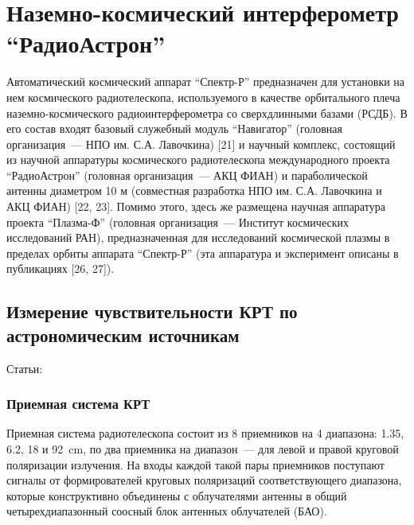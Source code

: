 \graphicspath{{Dissertation/images/chapt2/}}

\chapter{Наземно-космический интерферометр ``РадиоАстрон''} \label{chapt2}

Автоматический космический аппарат ``Спектр-Р'' предназначен для установки на нем космического
радиотелескопа, используемого в качестве орбитального плеча наземно-космического
радиоинтерферометра со сверхдлинными базами (РСДБ). В его состав входят базовый служебный модуль
``Навигатор'' (головная организация~--- НПО им. С.А. Лавочкина) [21] и научный комплекс, состоящий
из научной аппаратуры космического радиотелескопа международного проекта ``РадиоАстрон'' (головная
организация~--- АКЦ ФИАН) и параболической антенны диаметром 10 м (совместная разработка НПО им.
С.А. Лавочкина и АКЦ ФИАН) [22, 23]. Помимо этого, здесь же размещена научная аппаратура проекта
``Плазма-Ф'' (головная организация~--- Институт космических исследований РАН), предназначенная для
исследований космической плазмы в пределах орбиты аппарата ``Спектр-Р'' (эта аппаратура и
эксперимент описаны в публикациях [26, 27]).



\section{Измерение чувствительности КРТ по астрономическим источникам}

Статьи: \cite{Kardashev_2013_rus, Kovalev_2014_rus}

\subsection{Приемная система КРТ}

Приемная система радиотелескопа состоит из 8 приемников на 4 диапазона: 1.35, 6.2, 18 и
\SI{92}{\cm}, по два приемника на диапазон~--- для левой и правой круговой поляризации излучения. На
входы каждой такой пары приемников поступают сигналы от формирователей круговых поляризаций
соответствующего диапазона, которые конструктивно объединены с облучателями антенны в общий
четырехдиапазонный соосный блок антенных облучателей (БАО).

